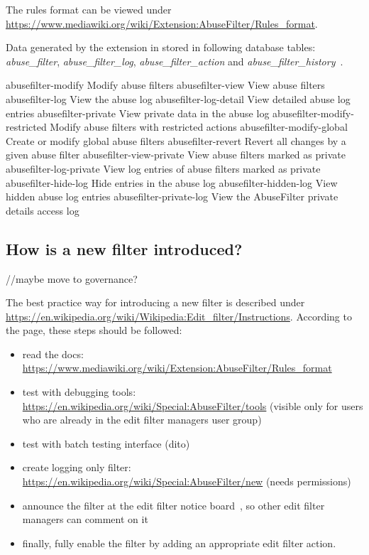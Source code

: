 The rules format can be viewed under \url{https://www.mediawiki.org/wiki/Extension:AbuseFilter/Rules_format}.


Data generated by the extension in stored in following database tables: \emph{abuse\_filter}, \emph{abuse\_filter\_log}, \emph{abuse\_filter\_action} and \emph{abuse\_filter\_history}~\cite{gerrit-abusefilter}.

abusefilter-modify 	Modify abuse filters
abusefilter-view 	View abuse filters
abusefilter-log 	View the abuse log
abusefilter-log-detail 	View detailed abuse log entries
abusefilter-private 	View private data in the abuse log
abusefilter-modify-restricted 	Modify abuse filters with restricted actions
abusefilter-modify-global 	Create or modify global abuse filters
abusefilter-revert 	Revert all changes by a given abuse filter
abusefilter-view-private 	View abuse filters marked as private
abusefilter-log-private 	View log entries of abuse filters marked as private
abusefilter-hide-log 	Hide entries in the abuse log
abusefilter-hidden-log 	View hidden abuse log entries
abusefilter-private-log 	View the AbuseFilter private details access log

\subsection{How is a new filter introduced?}
//maybe move to governance?

The best practice way for introducing a new filter is described under \url{https://en.wikipedia.org/wiki/Wikipedia:Edit_filter/Instructions}.
According to the page, these steps should be followed:
\begin{itemize}
    \item read the docs: \url{https://www.mediawiki.org/wiki/Extension:AbuseFilter/Rules_format}
    \item test with debugging tools: \url{https://en.wikipedia.org/wiki/Special:AbuseFilter/tools} (visible only for users who are already in the edit filter managers user group)
    \item test with batch testing interface (dito)
    \item create logging only filter: \url{https://en.wikipedia.org/wiki/Special:AbuseFilter/new} (needs permissions)
    \item announce the filter at the edit filter notice board~\cite{Wikipedia:EditFilterNoticeboard}, so other edit filter managers can comment on it
    \item finally, fully enable the filter by adding an appropriate edit filter action.
\end{itemize}

